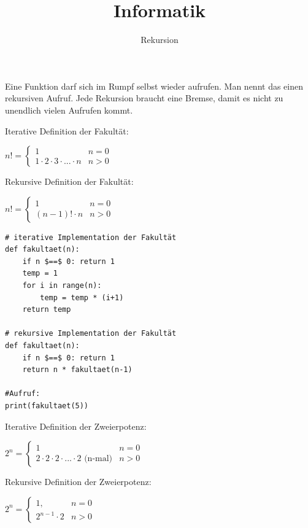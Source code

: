 \documentclass{beamer}
\begin{document}
\title{Informatik}   
\author{Rekursion} 
\date{}
\frame{\titlepage} 

\begin{frame}[fragile]
Eine Funktion darf sich im Rumpf selbst wieder aufrufen. 
Man nennt das einen rekursiven Aufruf. \pause Jede Rekursion braucht eine Bremse,
 damit es nicht zu unendlich vielen Aufrufen kommt. 

Iterative Definition der Fakultät:  

$n! =\begin{cases}
 1   &  n = 0 \\
 1 \cdot 2 \cdot 3 \cdot ... \cdot n & n > 0 
\end{cases} $ 

Rekursive Definition der Fakultät: 

$n! =\begin{cases}
 1   & n = 0 \\ 
 (n-1)! \cdot n & n > 0 
\end{cases} $
\end{frame}


\begin{frame}[fragile]
\begin{lstlisting} 
# iterative Implementation der Fakultät
def fakultaet(n):
    if n $==$ 0: return 1
    temp = 1
    for i in range(n):
        temp = temp * (i+1)
    return temp

# rekursive Implementation der Fakultät
def fakultaet(n):
    if n $==$ 0: return 1
    return n * fakultaet(n-1)
    
#Aufruf:
print(fakultaet(5))
\end{lstlisting} 
\end{frame}


\begin{frame}[fragile]

Iterative Definition der Zweierpotenz:

$2^n =\begin{cases}
 1   &  n = 0 \\
 2 \cdot 2 \cdot 2 \cdot ... \cdot 2 \text{  (n-mal)} & n > 0 
\end{cases} $ \pause

Rekursive Definition der Zweierpotenz:

$2^n =\begin{cases}
 1,   & n = 0 \\
 2^{n-1} \cdot 2 & n > 0 
\end{cases} $
\end{frame}
\end{document}
